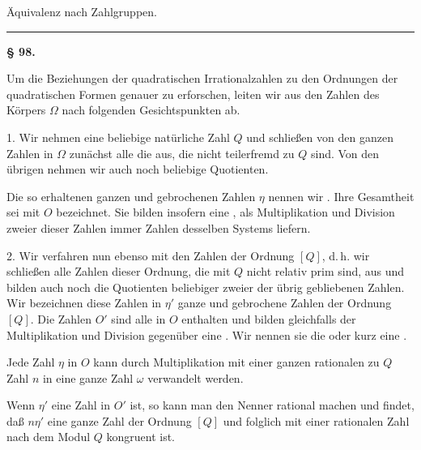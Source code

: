 
\begin{center}

Äquivalenz nach Zahlgruppen.
\end{center}

\rule{0.3\textwidth}{0.4pt}

\begin{center}
\textbf{§ 98. }
\end{center}

Um die Beziehungen der quadratischen Irrationalzahlen zu
den Ordnungen der quadratischen Formen genauer zu erforschen,
leiten wir aus den Zahlen des Körpers $\Omega$  nach
folgenden Gesichtspunkten ab.

1. Wir nehmen eine beliebige natürliche Zahl $Q$ und schließen
von den ganzen Zahlen in $\Omega$ zunächst alle die aus, die nicht
teilerfremd zu $Q$ sind. Von den übrigen nehmen wir auch noch
beliebige Quotienten.

Die so erhaltenen ganzen und gebrochenen Zahlen $\eta$ nennen
wir . Ihre Gesamtheit sei mit $O$ bezeichnet. Sie
bilden insofern eine , als Multiplikation und Division
zweier dieser Zahlen immer Zahlen desselben Systems liefern.

2. Wir verfahren nun ebenso mit den Zahlen der Ordnung $[Q]$,
d.\,h. wir schließen alle Zahlen dieser Ordnung, die mit $Q$ nicht
relativ prim sind, aus und bilden auch noch die Quotienten
beliebiger zweier der übrig gebliebenen Zahlen. Wir bezeichnen
diese Zahlen in $\eta'$ %
ganze und gebrochene Zahlen der Ordnung $[Q]$. Die Zahlen $O'$
sind alle in $O$ enthalten und bilden gleichfalls der Multiplikation
und Division gegenüber eine . Wir nennen sie die
 oder kurz eine .

Jede Zahl $\eta$ in $O$ kann durch Multiplikation mit einer ganzen
rationalen zu $Q$  Zahl $n$ in eine ganze Zahl $\omega$
verwandelt werden.

Wenn $\eta'$ eine Zahl in $O'$ ist, so kann man den Nenner
rational machen und findet, daß $n\eta'$ eine ganze Zahl der Ordnung
$[Q]$ und folglich mit einer rationalen Zahl nach dem Modul $Q$
kongruent ist.

